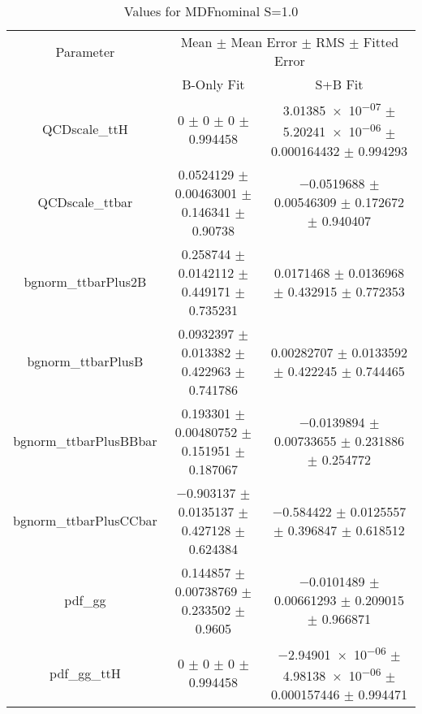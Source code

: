 \begin{table}
\centering
\caption{Values for MDFnominal S=1.0}
\begin{tabular}{ccc}
\toprule
Parameter & \multicolumn{2}{c}{Mean $\pm$ Mean Error $\pm$ RMS $\pm$ Fitted Error}\\
 & B-Only Fit & S+B Fit\\
\midrule
QCDscale\_ttH & \num{0} $\pm$ \num{0} $\pm$ \num{0} $\pm$ \num{0.994458} & \num{3.01385e-07} $\pm$ \num{5.20241e-06} $\pm$ \num{0.000164432} $\pm$ \num{0.994293}\\
QCDscale\_ttbar & \num{0.0524129} $\pm$ \num{0.00463001} $\pm$ \num{0.146341} $\pm$ \num{0.90738} & \num{-0.0519688} $\pm$ \num{0.00546309} $\pm$ \num{0.172672} $\pm$ \num{0.940407}\\
bgnorm\_ttbarPlus2B & \num{0.258744} $\pm$ \num{0.0142112} $\pm$ \num{0.449171} $\pm$ \num{0.735231} & \num{0.0171468} $\pm$ \num{0.0136968} $\pm$ \num{0.432915} $\pm$ \num{0.772353}\\
bgnorm\_ttbarPlusB & \num{0.0932397} $\pm$ \num{0.013382} $\pm$ \num{0.422963} $\pm$ \num{0.741786} & \num{0.00282707} $\pm$ \num{0.0133592} $\pm$ \num{0.422245} $\pm$ \num{0.744465}\\
bgnorm\_ttbarPlusBBbar & \num{0.193301} $\pm$ \num{0.00480752} $\pm$ \num{0.151951} $\pm$ \num{0.187067} & \num{-0.0139894} $\pm$ \num{0.00733655} $\pm$ \num{0.231886} $\pm$ \num{0.254772}\\
bgnorm\_ttbarPlusCCbar & \num{-0.903137} $\pm$ \num{0.0135137} $\pm$ \num{0.427128} $\pm$ \num{0.624384} & \num{-0.584422} $\pm$ \num{0.0125557} $\pm$ \num{0.396847} $\pm$ \num{0.618512}\\
pdf\_gg & \num{0.144857} $\pm$ \num{0.00738769} $\pm$ \num{0.233502} $\pm$ \num{0.9605} & \num{-0.0101489} $\pm$ \num{0.00661293} $\pm$ \num{0.209015} $\pm$ \num{0.966871}\\
pdf\_gg\_ttH & \num{0} $\pm$ \num{0} $\pm$ \num{0} $\pm$ \num{0.994458} & \num{-2.94901e-06} $\pm$ \num{4.98138e-06} $\pm$ \num{0.000157446} $\pm$ \num{0.994471}\\
\bottomrule
\end{tabular}
\end{table}